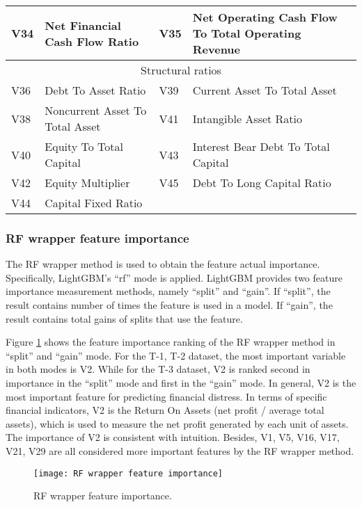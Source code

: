 \documentclass[review]{elsarticle}
\begin{document}
\begin{table}[H]
\begin{tabular}{llll}
    V34 & Net Financial Cash Flow Ratio & V35 & Net Operating Cash Flow To Total Operating Revenue \\ \hline
    \multicolumn{4}{c}{Structural ratios} \\ \hline
    V36 & Debt To Asset Ratio & V39 & Current Asset To Total Asset \\
    V38 & Noncurrent Asset To Total Asset & V41 & Intangible Asset Ratio \\
    V40 & Equity To Total Capital & V43 & Interest Bear Debt To Total Capital \\
    V42 & Equity Multiplier & V45 & Debt To Long Capital Ratio \\
    V44 & Capital Fixed Ratio &  &  \\ \hline
    \end{tabular}
\end{table}

\subsubsection{RF wrapper feature importance}
The RF wrapper method is used to obtain the feature actual importance. Specifically, LightGBM’s ``rf'' mode is applied. LightGBM provides two feature importance measurement methods, namely ``split'' and ``gain''. If ``split'', the result contains number of times the feature is used in a model. If ``gain'', the result contains total gains of splits that use the feature.

Figure \ref{fig: RF Wrapper Feature Importance} shows the feature importance ranking of the RF wrapper method in ``split'' and ``gain'' mode. For the T-1, T-2 dataset, the most important variable in both modes is V2. While for the T-3 dataset, V2 is ranked second in importance in the ``split'' mode and first in the ``gain'' mode. In general, V2 is the most important feature for predicting financial distress. In terms of specific financial indicators, V2 is the Return On Assets (net profit / average total assets), which is used to measure the net profit generated by each unit of assets. The importance of V2 is consistent with intuition. Besides, V1, V5, V16, V17, V21, V29 are all considered more important features by the RF wrapper method.

\begin{figure}[H]
    \centering
    \texttt{[image: RF wrapper feature importance]}
    \caption{RF wrapper feature importance.}
    \label{fig: RF Wrapper Feature Importance}
\end{figure}
\end{document}
